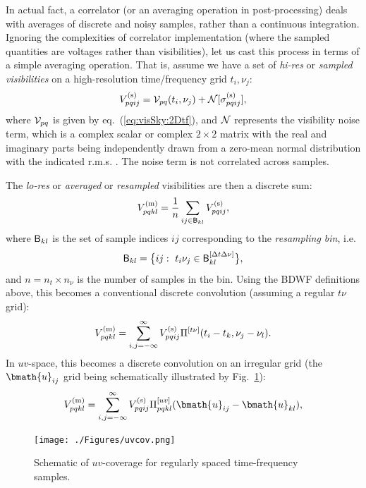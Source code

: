\documentclass[useAMS,usenatbib]{mn2e}
\begin{document}
In actual fact, a correlator (or an averaging operation in post-processing) deals with averages of discrete and noisy
samples, rather than a continuous integration. Ignoring the complexities of correlator implementation (where the sampled
quantities are voltages rather than visibilities), let us cast this process in terms of a simple averaging operation.
That is, assume we have a set of \emph{hi-res} or \emph{sampled visibilities} on a high-resolution time/frequency grid
$t_i,\nu_j$:
\begin{equation}
\label{eq:sampling}
V^\mathrm{(s)}_{pqij} = \mathcal{V}_{pq}(t_i,\nu_j) + \mathcal{N}[\sigma^\mathrm{(s)}_{pqij}],
\end{equation}
where $\mathcal{V}_{pq}$ is given by eq.~(\ref{eq:visSky:2Dtf}), and $\mathcal{N}$ represents the visibility noise term, which is
a complex scalar or complex $2\times2$ matrix with the real and imaginary parts being independently drawn from a 
zero-mean normal distribution with the indicated r.m.s. \citep[{\bf see noise chapter in}][]{TMS}. The noise
term is not correlated across samples.

The \emph{lo-res} or \emph{averaged} or \emph{resampled} visibilities are then a discrete sum:
\begin{equation}
\label{eq:discrete:tf0}
V^\mathrm{(m)}_{pqkl} = \frac{1}{n} \sum_{ij\in\mathsf{B}_{kl}}  V^\mathrm{(s)}_{pqij},
\end{equation}
where $\mathsf{B}_{kl}$ is the set of sample indices $ij$ corresponding to the \emph{resampling bin}, i.e.
\begin{equation}
\mathsf{B}_{kl} = \big \{ ij:~t_i\nu_j \in \mathsf{B}^{[\Delta t\Delta\nu]}_{kl} \big \},
\end{equation}
and $n = n_t\times n_\nu$ is the number of samples in the bin. 
Using the BDWF definitions above, this becomes a conventional discrete convolution (assuming a regular 
$t\nu$ grid):
\begin{equation}
\label{eq:discrete:tf}
V^\mathrm{(m)}_{pqkl} = \sum_{i,j=-\infty}^{\infty}  V^\mathrm{(s)}_{pqij} \Pi^{[t\nu]}(t_i-t_k,\nu_j-\nu_l).
\end{equation}
In $uv$-space, this becomes a discrete convolution on an irregular grid (the $\bmath{u}_{ij}$ grid being schematically illustrated by Fig.~\ref{fig:uvcov}):
\begin{equation}
\label{eq:discrete:uv}
V^\mathrm{(m)}_{pqkl} = \sum_{i,j=-\infty}^{\infty}  \Vs_{pqij} \Puv_{pqkl}(\bmath{u}_{ij}-\bmath{u}_{kl}),
\end{equation}

\begin{figure}
\texttt{[image: ./Figures/uvcov.png]}\caption{Schematic of $uv$-coverage for 
regularly spaced time-frequency samples.}\label{fig:uvcov}
\end{figure}
\end{document}
